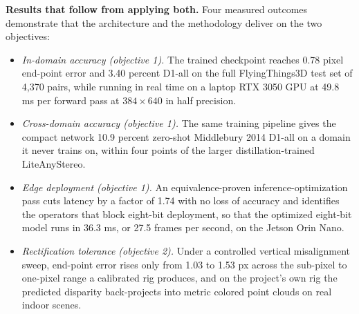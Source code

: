 \textbf{Results that follow from applying both.} Four measured outcomes
demonstrate that the architecture and the methodology deliver on the
two objectives:
\begin{itemize}
\item \emph{In-domain accuracy (objective 1).} The trained checkpoint
reaches 0.78 pixel end-point error and 3.40 percent D1-all on the full
FlyingThings3D test set of 4,370 pairs, while running in real time on a
laptop RTX 3050 GPU at 49.8 ms per forward pass at $384 \times 640$ in
half precision.
\item \emph{Cross-domain accuracy (objective 1).} The same training
pipeline gives the compact network 10.9 percent zero-shot Middlebury
2014 D1-all on a domain it never trains on, within four points of the
larger distillation-trained LiteAnyStereo.
\item \emph{Edge deployment (objective 1).} An equivalence-proven
inference-optimization pass cuts latency by a factor of 1.74 with no
loss of accuracy and identifies the operators that block eight-bit
deployment, so that the optimized eight-bit model runs in 36.3 ms, or
27.5 frames per second, on the Jetson Orin Nano.
\item \emph{Rectification tolerance (objective 2).} Under a controlled
vertical misalignment sweep, end-point error rises only from 1.03 to
1.53 px across the sub-pixel to one-pixel range a calibrated rig
produces, and on the project's own rig the predicted disparity
back-projects into metric colored point clouds on real indoor scenes.
\end{itemize}

\FloatBarrier
